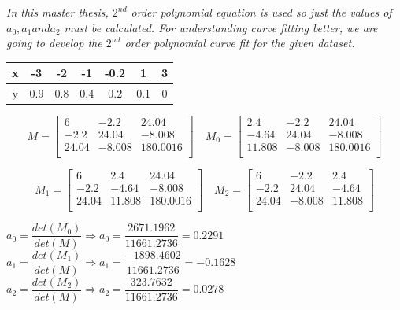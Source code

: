 \emph{\color{blue}In this master thesis, $ 2^{nd} $ order polynomial equation is used so just the values of $ a_{0}, a_{1} and a_{2} $ must be calculated. For understanding curve fitting better, we are going to develop the $ 2^{nd} $ order polynomial curve fit for the given dataset.}

\begin{center}
  \begin{tabular}{ | c | c | c | c | c | c | c |}
    \hline
    x & -3  &  -2  &  -1  & -0.2  &  1  &  3 \\ \hline
    y & 0.9 &  0.8 &  0.4 &  0.2  & 0.1 &  0 \\
    \hline
  \end{tabular}
\end{center}

\[
 M = \begin{bmatrix}
6 & -2.2 & 24.04 \\
-2.2 & 24.04 & -8.008 \\
24.04 & -8.008 & 180.0016 \\

\end{bmatrix} \quad
 M_{0} = \begin{bmatrix}
2.4 & -2.2 & 24.04 \\
-4.64 & 24.04 & -8.008 \\
11.808 & -8.008 & 180.0016 \\

\end{bmatrix} 
\]

\[
 M_{1} = \begin{bmatrix}
6 & 2.4 & 24.04 \\
-2.2 & -4.64 & -8.008 \\
24.04 & 11.808 & 180.0016 \\

\end{bmatrix} \quad
 M_{2} = \begin{bmatrix}
6 & -2.2 & 2.4 \\
-2.2 & 24.04 & -4.64 \\
24.04 & -8.008 & 11.808 \\

\end{bmatrix}
\]

$ a_{0} = \dfrac{det(M_{0})}{det(M)}   \Longrightarrow  a_{0} = \dfrac{ 2671.1962}{11661.2736} = 0.2291$  \vfill 
$ a_{1} = \dfrac{det(M_{1})}{det(M)} \Longrightarrow  a_{1} = \dfrac{ -1898.4602}{11661.2736} = -0.1628$  \vfill 
$ a_{2} = \dfrac{det(M_{2})}{det(M)} \Longrightarrow  a_{2} = \dfrac{ 323.7632}{11661.2736} = 0.0278$

